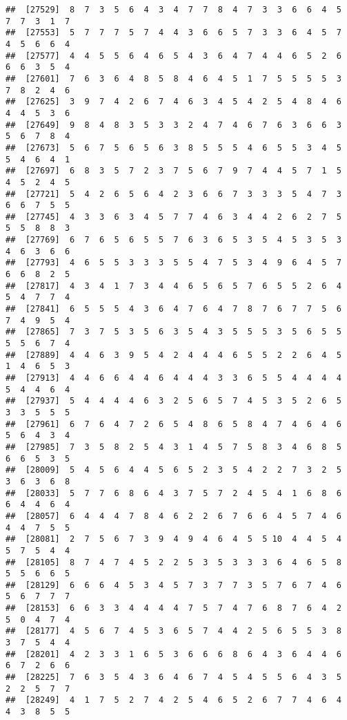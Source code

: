 \documentclass[
]{book}
\begin{document}
\begin{verbatim}
##  [27529]  8  7  3  5  6  4  3  4  7  7  8  4  7  3  3  6  6  4  5  7  7  3  1  7
##  [27553]  5  7  7  7  5  7  4  4  3  6  6  5  7  3  3  6  4  5  7  4  5  6  6  4
##  [27577]  4  4  5  5  6  4  6  5  4  3  6  4  7  4  4  6  5  2  6  6  6  3  5  4
##  [27601]  7  6  3  6  4  8  5  8  4  6  4  5  1  7  5  5  5  5  3  7  8  2  4  6
##  [27625]  3  9  7  4  2  6  7  4  6  3  4  5  4  2  5  4  8  4  6  4  4  5  3  6
##  [27649]  9  8  4  8  3  5  3  3  2  4  7  4  6  7  6  3  6  6  3  5  6  7  8  4
##  [27673]  5  6  7  5  6  5  6  3  8  5  5  5  4  6  5  5  3  4  5  5  4  6  4  1
##  [27697]  6  8  3  5  7  2  3  7  5  6  7  9  7  4  4  5  7  1  5  4  5  2  4  5
##  [27721]  5  4  2  6  5  6  4  2  3  6  6  7  3  3  3  5  4  7  3  6  6  7  5  5
##  [27745]  4  3  3  6  3  4  5  7  7  4  6  3  4  4  2  6  2  7  5  5  5  8  8  3
##  [27769]  6  7  6  5  6  5  5  7  6  3  6  5  3  5  4  5  3  5  3  4  6  3  6  6
##  [27793]  4  6  5  5  3  3  3  5  5  4  7  5  3  4  9  6  4  5  7  6  6  8  2  5
##  [27817]  4  3  4  1  7  3  4  4  6  5  6  5  7  6  5  5  2  6  4  5  4  7  7  4
##  [27841]  6  5  5  5  4  3  6  4  7  6  4  7  8  7  6  7  7  5  6  7  4  9  5  4
##  [27865]  7  3  7  5  3  5  6  3  5  4  3  5  5  5  3  5  6  5  5  5  5  6  7  4
##  [27889]  4  4  6  3  9  5  4  2  4  4  4  6  5  5  2  2  6  4  5  1  4  6  5  3
##  [27913]  4  4  6  6  4  4  6  4  4  4  3  3  6  5  5  4  4  4  4  5  4  4  6  4
##  [27937]  5  4  4  4  4  6  3  2  5  6  5  7  4  5  3  5  2  6  5  3  3  5  5  5
##  [27961]  6  7  6  4  7  2  6  5  4  8  6  5  8  4  7  4  6  4  6  5  6  4  3  4
##  [27985]  7  3  5  8  2  5  4  3  1  4  5  7  5  8  3  4  6  8  5  6  6  5  3  5
##  [28009]  5  4  5  6  4  4  5  6  5  2  3  5  4  2  2  7  3  2  5  3  6  3  6  8
##  [28033]  5  7  7  6  8  6  4  3  7  5  7  2  4  5  4  1  6  8  6  6  4  4  6  4
##  [28057]  6  4  4  4  7  8  4  6  2  2  6  7  6  6  4  5  7  4  6  4  4  7  5  5
##  [28081]  2  7  5  6  7  3  9  4  9  4  6  4  5  5 10  4  4  5  4  5  7  5  4  4
##  [28105]  8  7  4  7  4  5  2  2  5  3  5  3  3  3  6  4  6  5  8  5  5  6  6  5
##  [28129]  6  6  6  4  5  3  4  5  7  3  7  7  3  5  7  6  7  4  6  5  6  7  7  7
##  [28153]  6  6  3  3  4  4  4  4  7  5  7  4  7  6  8  7  6  4  2  5  0  4  7  4
##  [28177]  4  5  6  7  4  5  3  6  5  7  4  4  2  5  6  5  5  3  8  3  7  5  4  4
##  [28201]  4  2  3  3  1  6  5  3  6  6  6  8  6  4  3  6  4  4  6  6  7  2  6  6
##  [28225]  7  6  3  5  4  3  6  4  6  7  4  5  4  5  5  6  4  3  5  2  2  5  7  7
##  [28249]  4  1  7  5  2  7  4  2  5  4  6  5  2  6  7  7  4  6  4  4  3  8  5  5

\end{verbatim}
\end{document}
